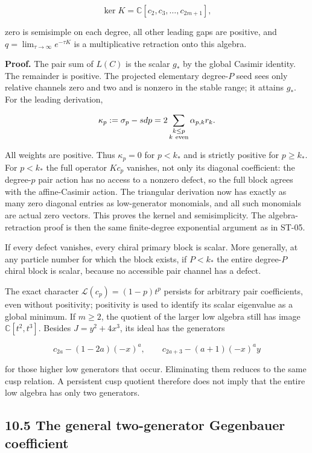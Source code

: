 \[
\ker K=\mathbb C[c_2,c_3,\ldots,c_{2m+1}],
\]

zero is semisimple on each degree, all other leading gaps are positive, and \(q=\lim_{\tau\to\infty}e^{-\tau K}\) is a multiplicative retraction onto this algebra.

\textbf{Proof.} The pair sum of \(L(C)\) is the scalar \(g_*\) by the global Casimir identity. The remainder is positive. The projected elementary degree-\(P\) seed sees only relative channels zero and two and is nonzero in the stable range; it attains \(g_*\). For the leading derivation,

\[
\kappa_p:=\sigma_p-sdp
=2\sum_{\substack{k\leq p\\k\ {\rm even}}}\alpha_{p,k}r_k.
\]

All weights are positive. Thus \(\kappa_p=0\) for \(p<k_*\) and is strictly positive for \(p\geq k_*\). For \(p<k_*\) the full operator \(Kc_p\) vanishes, not only its diagonal coefficient: the degree-\(p\) pair action has no access to a nonzero defect, so the full block agrees with the affine-Casimir action. The triangular derivation now has exactly as many zero diagonal entries as low-generator monomials, and all such monomials are actual zero vectors. This proves the kernel and semisimplicity. The algebra-retraction proof is then the same finite-degree exponential argument as in ST-05.

If every defect vanishes, every chiral primary block is scalar. More generally, at any particle number for which the block exists, if \(P<k_*\) the entire degree-\(P\) chiral block is scalar, because no accessible pair channel has a defect.

The exact character \(\mathcal L(c_p)=(1-p)t^p\) persists for arbitrary pair coefficients, even without positivity; positivity is used to identify its scalar eigenvalue as a global minimum. If \(m\geq2\), the quotient of the larger low algebra still has image \(\mathbb C[t^2,t^3]\). Besides \(J=y^2+4x^3\), its ideal has the generators

\[
c_{2a}-(1-2a)(-x)^a,\qquad
c_{2a+3}-(a+1)(-x)^a y
\]

for those higher low generators that occur. Eliminating them reduces to the same cusp relation. A persistent cusp quotient therefore does not imply that the entire low algebra has only two generators.

\hypertarget{the-general-two-generator-gegenbauer-coefficient}{%
\subsection{10.5 The general two-generator Gegenbauer coefficient}\label{the-general-two-generator-gegenbauer-coefficient}}

